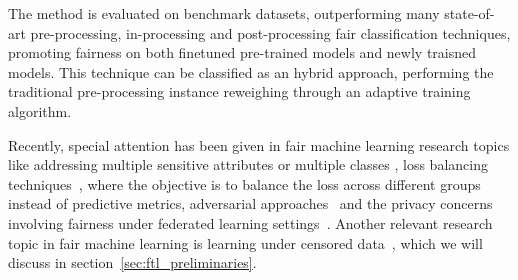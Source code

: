 The method is evaluated on benchmark datasets, outperforming many state-of-art pre-processing, in-processing and post-processing fair classification techniques, promoting fairness on both finetuned pre-trained models and newly traisned models. This technique can be classified as an hybrid approach, performing the traditional pre-processing instance reweighing through an adaptive training algorithm.

Recently, special attention has been given in fair machine learning research topics like addressing multiple sensitive attributes or multiple classes \citep{DAloisio2023,Liu_Wang_Wang_Wang_Su_Gao_2023}, loss balancing techniques~\citep{KIM2023231,KhaliliZA23}, where the objective is to balance the loss across different groups instead of predictive metrics, adversarial approaches~\citep{Liang2023,ZhangZLZY23,GrariLD23,MousaviMD23,Zeming2023,Yuchen2023} and the privacy concerns involving fairness under federated learning settings~\citep{ChenZZZY24,VucinichZ23}. Another relevant research topic in fair machine learning is learning under censored data~\citep{WZhang2022,WZhang2023_a,WZhang2023_b,WZhang2023_c}, which we will discuss in section~\ref{sec:ftl_preliminaries}.